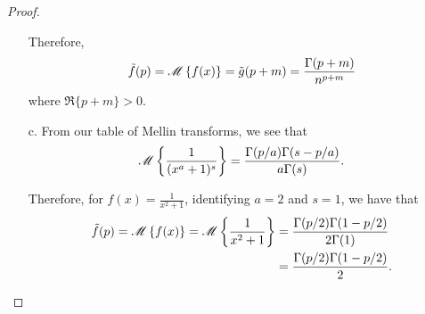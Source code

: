\begin{proof}
\begin{enumerate}
      Therefore,
      \begin{align*}
        \tilde{f}(p) = \mathscr{M}\left\{ {f(x)} \right\} = \tilde{g}(p + m) = \frac{\Gamma(p + m)}{n^{p+m}}
      \end{align*}
      where $\Re{\{p + m\}} > 0$.

    \item[c.] From our table of Mellin transforms,
      we see that
      \begin{align*}
        \mathscr{M}\left\{ {\frac{1}{(x^a + 1)^s}} \right\} = \frac{\Gamma(p/a)\Gamma(s - p/a)}{a \Gamma(s)}.
      \end{align*}

      Therefore, for $f(x) = \frac{1}{x^2 + 1}$, identifying $a = 2$ and $s = 1$, we have that
      \begin{align*}
        \tilde{f}(p) = \mathscr{M}\left\{ {f(x)} \right\} = \mathscr{M}\left\{ {\frac{1}{x^2 + 1}} \right\}
        &= \frac{\Gamma(p/2)\Gamma(1 - p/2)}{2 \Gamma(1)} \\
        &= \frac{\Gamma(p/2)\Gamma(1 - p/2)}{2 }.
      \end{align*}

  \end{enumerate}
\end{proof}
\newpage
